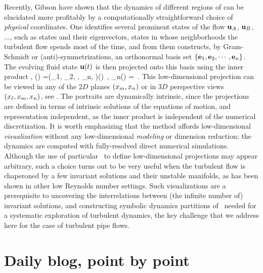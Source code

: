 Recently, Gibson \etal{} have shown that the dynamics of different regions
of {\statesp} can be elucidated more profitably by a computationally
straight\-forward choice of \emph{physical} coordinates. One identifies
several prominent states of the flow ${\bf u}_A$, ${\bf u}_B$, $\dots$, such as
{\eqv} states and their eigenvectors, states in whose neighborhoods the
turbulent flow spends most of the time, and from them constructs, by
Gram-Schmidt or (anti)-symmetrizations, an orthonormal basis set
$\{{\bf e}_1, {\bf e}_2, \cdots, {\bf e}_n\}$. The evolving fluid state ${\bf u}(t)$
is then projected onto this basis using the inner product
,
\beq
\ssp(\zeit) =(\ssp_1, \ssp_2, \cdots, \ssp_n, \cdots)(\zeit)
    \,,\qquad
\ssp_n(\zeit) = 
\,.
This low-dimensional projection can be viewed in any of the $2D$ planes
$(\ssp_m, \ssp_n)$ or in $3D$ perspective views $(\ssp_{\ell},\ssp_m,
\ssp_n)$, see . The {\stateDsp} portraits are
{dynamically intrinsic}, since the projections are defined in terms of
intrinsic solutions of the equations of motion, and {representation
independent}, as the inner product  is independent of
the numerical discretization. It is worth emphasizing that the method
affords low-dimensional {\em visualization} without any low-dimensional
{\em modeling} or dimension reduction; the dynamics are computed with
fully-resolved direct numerical simulations. Although the use of
particular \reqva\ to define low-dimensional projections
may appear arbitrary, such a choice turns out to be
very useful when the turbulent flow is chaperoned by a few invariant
solutions and their unstable manifolds, as has been shown in other low
Reynolds number settings. Such visualizations are a
prerequisite to uncovering the interrelations between (the infinite
number of) invariant solutions, and constructing symbolic dynamics
partitions of \statesp\ needed for a systematic exploration of turbulent
dynamics, the key challenge that we address here for the case of turbulent
pipe flows.

\renewcommand{\ssp}{x}

\section{Daily blog, point by point}
\label{sect:blogBaroclin}


